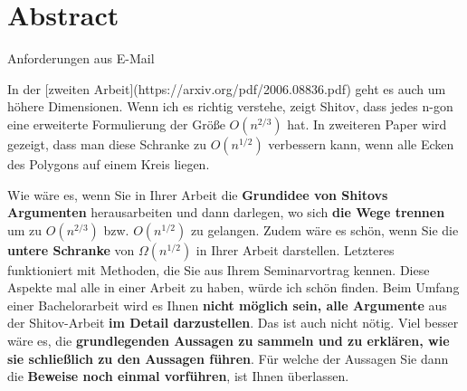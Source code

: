 \section*{Abstract}

{\large
  Anforderungen aus E-Mail
}

{\tiny In der [zweiten Arbeit](https://arxiv.org/pdf/2006.08836.pdf) geht es auch um höhere Dimensionen. Wenn ich es richtig verstehe, zeigt Shitov, dass jedes n-gon eine erweiterte Formulierung der Größe $O(n^{2/3})$ hat. In zweiteren Paper wird gezeigt, dass man diese Schranke zu $O(n^{1/2})$ verbessern kann, wenn alle Ecken des Polygons auf einem Kreis liegen.}

Wie wäre es, wenn Sie in Ihrer Arbeit die \textbf{Grundidee von Shitovs Argumenten} herausarbeiten und dann darlegen, wo sich \textbf{die Wege trennen} um zu $O(n^{2/3})$ bzw. $O(n^{1/2})$ zu gelangen. 
{\tiny Zudem wäre es schön, wenn Sie die \textbf{untere Schranke} von $\Omega(n^{1/2})$ in Ihrer Arbeit darstellen. Letzteres funktioniert mit Methoden, die Sie aus Ihrem Seminarvortrag kennen. Diese Aspekte mal alle in einer Arbeit zu haben, würde ich schön finden.}
Beim Umfang einer Bachelorarbeit wird es Ihnen \textbf{nicht möglich sein, alle Argumente} aus der Shitov-Arbeit \textbf{im Detail darzustellen}. Das ist auch nicht nötig. Viel besser wäre es, die \textbf{grundlegenden Aussagen zu sammeln und zu erklären, wie sie schließlich zu den Aussagen führen}. Für welche der Aussagen Sie dann die \textbf{Beweise noch einmal vorführen}, ist Ihnen überlassen.
